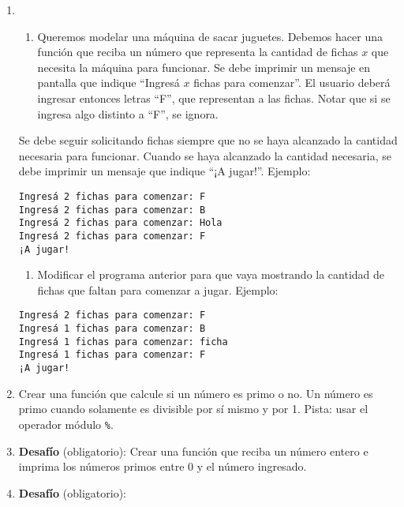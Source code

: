 \documentclass[
  letterpaper,
  DIV=11,
  numbers=noendperiod]{scrreprt}
\providecommand{\tightlist}{%
  \setlength{\itemsep}{0pt}\setlength{\parskip}{0pt}}\usepackage{longtable,booktabs,array}
\begin{document}
\begin{enumerate}
\def\labelenumi{\arabic{enumi}.}
\setcounter{enumi}{7}
\item
  \begin{enumerate}
  \def\labelenumii{\alph{enumii}.}
  \tightlist
  \item
    Queremos modelar una máquina de sacar juguetes. Debemos hacer una
    función que reciba un número que representa la cantidad de fichas
    \(x\) que necesita la máquina para funcionar. Se debe imprimir un
    mensaje en pantalla que indique ``Ingresá \(x\) fichas para
    comenzar''. El usuario deberá ingresar entonces letras ``F'', que
    representan a las fichas. Notar que si se ingresa algo distinto a
    ``F'', se ignora.
  \end{enumerate}

  Se debe seguir solicitando fichas siempre que no se haya alcanzado la
  cantidad necesaria para funcionar. Cuando se haya alcanzado la
  cantidad necesaria, se debe imprimir un mensaje que indique ``¡A
  jugar!''. Ejemplo:

\begin{verbatim}
Ingresá 2 fichas para comenzar: F
Ingresá 2 fichas para comenzar: B
Ingresá 2 fichas para comenzar: Hola
Ingresá 2 fichas para comenzar: F
¡A jugar!
\end{verbatim}

  \begin{enumerate}
  \def\labelenumii{\alph{enumii}.}
  \setcounter{enumii}{1}
  \tightlist
  \item
    Modificar el programa anterior para que vaya mostrando la cantidad
    de fichas que faltan para comenzar a jugar. Ejemplo:
  \end{enumerate}

\begin{verbatim}
Ingresá 2 fichas para comenzar: F
Ingresá 1 fichas para comenzar: B
Ingresá 1 fichas para comenzar: ficha
Ingresá 1 fichas para comenzar: F
¡A jugar!
\end{verbatim}
\item
  Crear una función que calcule si un número es primo o no. Un número es
  primo cuando solamente es divisible por sí mismo y por 1. Pista: usar
  el operador módulo \texttt{\%}.
\item
  \textbf{Desafío} (obligatorio): Crear una función que reciba un número
  entero e imprima los números primos entre 0 y el número ingresado.
\item
  \textbf{Desafío} (obligatorio):


\end{enumerate}
\end{document}
